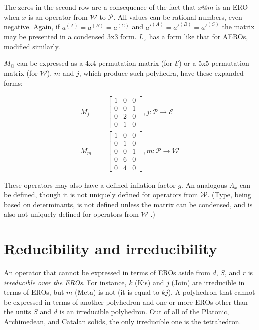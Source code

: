 \documentclass{amsart}[12pt]
\begin{document}
The zeros in the second row are a consequence of the fact that $x@m$ is an ERO
when $x$ is an operator from $\mathcal{W}$ to $\mathcal{P}$. All values can be
rational numbers, even negative. Again, if $a^{(A)} = a^{(B)} = a^{(C)}$ and
$a'^{(A)} = a'^{(B)} = a'^{(C)}$ the matrix may be presented in a condensed 3x3
form. $L_x$ has a form like that for AEROs, modified similarly.

$M_@$ can be expressed as a 4x4 permutation matrix (for $\mathcal{E}$)
or a 5x5 permutation matrix (for $\mathcal{W}$). $m$ and $j$,
which produce such polyhedra, have these expanded forms:

\begin{equation}
  \begin{split}
  M_j &= \begin{bmatrix}
  1 & 0 & 0 \\
  0 & 0 & 1 \\
  0 & 2 & 0 \\
  0 & 1 & 0 \end{bmatrix}, j: \mathcal{P} \to \mathcal{E} \\
  M_m &= \begin{bmatrix}
  1 & 0 & 0 \\
  0 & 1 & 0 \\
  0 & 0 & 1 \\
  0 & 6 & 0 \\
  0 & 4 & 0 \end{bmatrix}, m: \mathcal{P} \to \mathcal{W}
  \end{split}
\end{equation}

These operators may also have a defined inflation factor $g$.
An analogous $\Lambda_x$ can be defined, though it is not uniquely
defined for operators from $\mathcal{W}$. (Type, being based on determinants,
is not defined unless the matrix can be condensed,
and is also not uniquely defined for operators from $\mathcal{W}$ .)

\section{Reducibility and irreducibility}
An operator that cannot be expressed in terms of EROs aside from $d$, $S$, and
$r$ is \textit{irreducible over the EROs}. For instance, $k$ (Kis) and $j$
(Join) are irreducible in terms of EROs, but $m$ (Meta) is not (it is equal to
$kj$). A polyhedron that cannot be expressed in terms of another polyhedron and
one or more EROs other than the units $S$ and $d$ is an irreducible polyhedron.
Out of all of the Platonic, Archimedean, and Catalan solids, the only
irreducible one is the tetrahedron.
\end{document}
